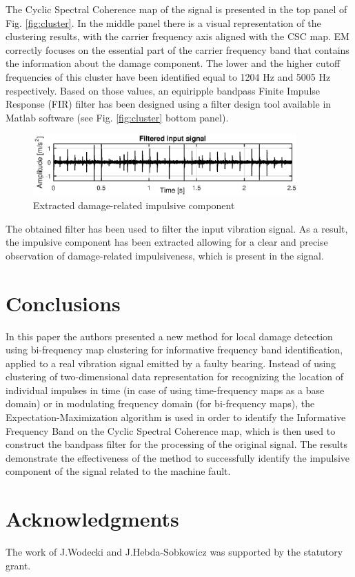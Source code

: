 \documentclass[10pt]{article}
\begin{document}
The Cyclic Spectral Coherence map of the signal is presented in the top panel of Fig. \ref{fig:cluster}. In the middle panel there is a visual representation of the clustering results, with the carrier frequency axis aligned with the CSC map. EM correctly focuses on the essential part of the carrier frequency band that contains the information about the damage component. The lower and the higher cutoff frequencies of this cluster have been identified equal to 1204 Hz and 5005 Hz respectively. Based on those values, an equiripple bandpass Finite Impulse Response (FIR) filter has been designed using a filter design tool available in Matlab software (see Fig. \ref{fig:cluster} bottom panel).

\begin{figure}[ht!]
\centering
\includegraphics[width=0.9\textwidth]{wykresy/out.eps}
\caption{Extracted damage-related impulsive component}
\label{fig:out}
\end{figure}

The obtained filter has been used to filter the input vibration signal. As a result, the impulsive component has been extracted allowing for a clear and precise observation of damage-related impulsiveness, which is present in the signal. 

\section{Conclusions}

In this paper the authors presented a new method for local damage detection using bi-frequency map clustering for informative frequency band identification, applied to a real vibration signal emitted by a faulty bearing. Instead of using clustering of two-dimensional data representation for recognizing the location of individual impulses in time (in case of using time-frequency maps as a base domain) or in modulating frequency domain (for bi-frequency maps), the Expectation-Maximization algorithm is used in order to identify the Informative Frequency Band on the Cyclic Spectral Coherence map, which is then used to construct the bandpass filter for the processing of the original signal. The results demonstrate the effectiveness of the method to successfully identify the impulsive component of the signal related to the machine fault.

\section*{Acknowledgments}
The work of J.Wodecki and J.Hebda-Sobkowicz was supported by the statutory grant.


\end{document}
